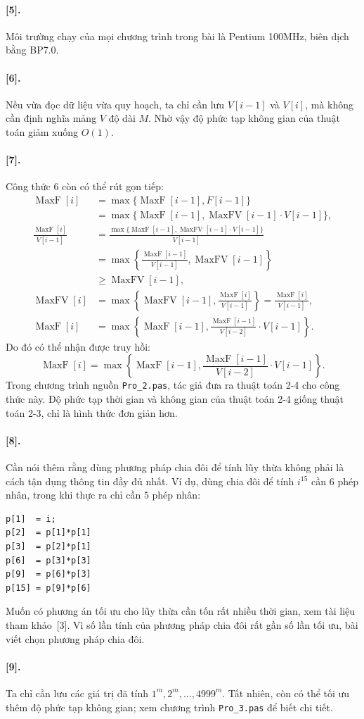 \documentclass[11pt]{article}
\begin{document}
\paragraph{[5].}
Môi trường chạy của mọi chương trình trong bài là Pentium 100MHz, biên dịch
bằng BP7.0.

\paragraph{[6].}
Nếu vừa đọc dữ liệu vừa quy hoạch, ta chỉ cần lưu \(V[i-1]\) và \(V[i]\), mà
không cần định nghĩa mảng \(V\) độ dài \(M\). Nhờ vậy độ phức tạp không gian
của thuật toán giảm xuống \(O(1)\).

\paragraph{[7].}
Công thức 6 còn có thể rút gọn tiếp:
\[
\begin{aligned}
\operatorname{MaxF}[i]
&=\max\{\operatorname{MaxF}[i-1],F[i-1]\}\\
&=\max\{\operatorname{MaxF}[i-1],
  \operatorname{MaxFV}[i-1]\cdot V[i-1]\},\\
\frac{\operatorname{MaxF}[i]}{V[i-1]}
&=\frac{\max\{\operatorname{MaxF}[i-1],
  \operatorname{MaxFV}[i-1]\cdot V[i-1]\}}{V[i-1]}\\
&=\max\left\{\frac{\operatorname{MaxF}[i-1]}{V[i-1]},
  \operatorname{MaxFV}[i-1]\right\}\\
&\ge \operatorname{MaxFV}[i-1],\\
\operatorname{MaxFV}[i]
&=\max\left\{\operatorname{MaxFV}[i-1],
  \frac{\operatorname{MaxF}[i]}{V[i-1]}\right\}
 = \frac{\operatorname{MaxF}[i]}{V[i-1]},\\
\operatorname{MaxF}[i]
&=\max\left\{\operatorname{MaxF}[i-1],
  \frac{\operatorname{MaxF}[i-1]}{V[i-2]}\cdot V[i-1]\right\}.
\end{aligned}
\]
Do đó có thể nhận được truy hồi:
\[
  \operatorname{MaxF}[i]
  = \max\left\{\operatorname{MaxF}[i-1],
  \frac{\operatorname{MaxF}[i-1]}{V[i-2]}\cdot V[i-1]\right\}.
\]
Trong chương trình nguồn \verb|Pro_2.pas|, tác giả đưa ra thuật toán 2-4 cho
công thức này. Độ phức tạp thời gian và không gian của thuật toán 2-4 giống
thuật toán 2-3, chỉ là hình thức đơn giản hơn.

\paragraph{[8].}
Cần nói thêm rằng dùng phương pháp chia đôi để tính lũy thừa không phải là
cách tận dụng thông tin đầy đủ nhất. Ví dụ, dùng chia đôi để tính \(i^{15}\)
cần \(6\) phép nhân, trong khi thực ra chỉ cần \(5\) phép nhân:
\begin{verbatim}
p[1]  = i;
p[2]  = p[1]*p[1]
p[3]  = p[2]*p[1]
p[6]  = p[3]*p[3]
p[9]  = p[6]*p[3]
p[15] = p[9]*p[6]
\end{verbatim}
Muốn có phương án tối ưu cho lũy thừa cần tốn rất nhiều thời gian, xem tài
liệu tham khảo~[3]. Vì số lần tính của phương pháp chia đôi rất gần số lần
tối ưu, bài viết chọn phương pháp chia đôi.

\paragraph{[9].}
Ta chỉ cần lưu các giá trị đã tính \(1^m,2^m,\ldots,4999^m\). Tất nhiên, còn
có thể tối ưu thêm độ phức tạp không gian; xem chương trình \verb|Pro_3.pas|
để biết chi tiết.
\end{document}
